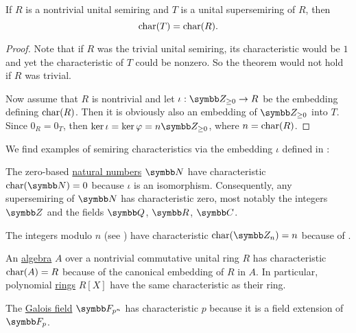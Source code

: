 \begin{proposition}\label{thm:embedding_preserves_characteristic}
  If \( R \) is a nontrivial unital semiring and \( T \) is a unital supersemiring of \( R \), then
  \begin{equation*}
    \operatorname{char}(T) = \operatorname{char}(R).
  \end{equation*}
\end{proposition}
\begin{proof}
  Note that if \( R \) was the trivial unital semiring, its characteristic would be \( 1 \) and yet the characteristic of \( T \) could be nonzero. So the theorem would not hold if \( R \) was trivial.

  Now assume that \( R \) is nontrivial and let \( \iota: \BZ_{\geq 0} \to R \) be the embedding defining \( \operatorname{char}(R) \). Then it is obviously also an embedding of \( \BZ_{\geq 0} \) into \( T \). Since \( 0_R = 0_T \), then \( \ker \iota = \ker \varphi = n\BZ_{\geq 0} \), where \( n = \operatorname{char}(R) \).
\end{proof}

\begin{example}\label{ex:semiring_characteristic}
  We find examples of semiring characteristics via the embedding \( \iota \) defined in :

  \begin{ExEnum}
     The zero-based \hyperref[def:natural_numbers]{natural numbers} \( \BN \) have characteristic \( \Char(\BN) = 0 \) because \( \iota \) is an isomorphism. Consequently, any supersemiring of \( \BN \) has characteristic zero, most notably the integers \( \BZ \) and the fields \( \BQ \), \( \BR \), \( \BC \).

     The integers modulo \( n \) (see ) have characteristic \( \Char(\BZ_n) = n \) because of .

     An \hyperref[def:algebra_over_ring]{algebra} \( A \) over a nontrivial commutative unital ring \( R \) has characteristic \( \operatorname{char}(A) = R \) because of the canonical embedding of \( R \) in \( A \). In particular, polynomial \hyperref[def:algebra_of_polynomials]{rings} \( R[X] \) have the same characteristic as their ring.

     The \hyperref[thm:galois_field_existence]{Galois field} \( \BF_{p^n} \) has characteristic \( p \) because it is a field extension of \( \BF_p \).
  \end{ExEnum}
\end{example}

